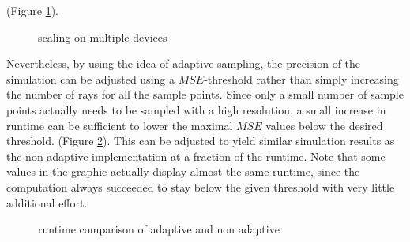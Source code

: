 (Figure \ref{plot:gpu_scaling}).
\begin{figure}[H]
  \centerline{
    }
  \caption{scaling on multiple devices}
  \label{plot:gpu_scaling}
\end{figure}
Nevertheless, by using the idea of adaptive sampling, the precision of the
simulation can be adjusted using a $MSE$-threshold rather than simply increasing
the number of rays for all the sample points. Since only a small number of
sample points actually needs to be sampled with a high resolution, a small
increase in runtime can be sufficient to lower the maximal $MSE$ values below
the desired threshold. (Figure \ref{plot:adaptive_runtime}). This can be
adjusted to yield similar simulation results as the non-adaptive implementation
at a fraction of the runtime. Note that some values in the graphic actually
display almost the same runtime, since the computation always succeeded to stay
below the given threshold with very little additional effort.
\begin{figure}[H]
  \centerline{
    }
  \caption{runtime comparison of adaptive and non adaptive }
  \label{plot:adaptive_runtime}
\end{figure}

